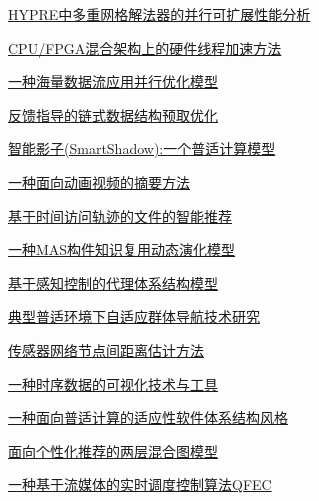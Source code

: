 \documentclass[a4paper]{article}
\begin{document}
\href{http://www.jos.org.cn/ch/reader/download_pdf.aspx?file_no=09002&year_id=2009&quarter_id=zk&falg=1}{HYPRE中多重网格解法器的并行可扩展性能分析}

\href{http://www.jos.org.cn/ch/reader/download_pdf.aspx?file_no=09003&year_id=2009&quarter_id=zk&falg=1}{CPU/FPGA混合架构上的硬件线程加速方法}

\href{http://www.jos.org.cn/ch/reader/download_pdf.aspx?file_no=09004&year_id=2009&quarter_id=zk&falg=1}{一种海量数据流应用并行优化模型}

\href{http://www.jos.org.cn/ch/reader/download_pdf.aspx?file_no=09005&year_id=2009&quarter_id=zk&falg=1}{反馈指导的链式数据结构预取优化}

\href{http://www.jos.org.cn/ch/reader/download_pdf.aspx?file_no=09006&year_id=2009&quarter_id=zk&falg=1}{智能影子(SmartShadow):一个普适计算模型}

\href{http://www.jos.org.cn/ch/reader/download_pdf.aspx?file_no=09007&year_id=2009&quarter_id=zk&falg=1}{一种面向动画视频的摘要方法}

\href{http://www.jos.org.cn/ch/reader/download_pdf.aspx?file_no=09008&year_id=2009&quarter_id=zk&falg=1}{基于时间访问轨迹的文件的智能推荐}

\href{http://www.jos.org.cn/ch/reader/download_pdf.aspx?file_no=09009&year_id=2009&quarter_id=zk&falg=1}{一种MAS构件知识复用动态演化模型}

\href{http://www.jos.org.cn/ch/reader/download_pdf.aspx?file_no=09010&year_id=2009&quarter_id=zk&falg=1}{基于感知控制的代理体系结构模型}

\href{http://www.jos.org.cn/ch/reader/download_pdf.aspx?file_no=09011&year_id=2009&quarter_id=zk&falg=1}{典型普适环境下自适应群体导航技术研究}

\href{http://www.jos.org.cn/ch/reader/download_pdf.aspx?file_no=09012&year_id=2009&quarter_id=zk&falg=1}{传感器网络节点间距离估计方法}

\href{http://www.jos.org.cn/ch/reader/download_pdf.aspx?file_no=09013&year_id=2009&quarter_id=zk&falg=1}{一种时序数据的可视化技术与工具}

\href{http://www.jos.org.cn/ch/reader/download_pdf.aspx?file_no=09014&year_id=2009&quarter_id=zk&falg=1}{一种面向普适计算的适应性软件体系结构风格}

\href{http://www.jos.org.cn/ch/reader/download_pdf.aspx?file_no=09015&year_id=2009&quarter_id=zk&falg=1}{面向个性化推荐的两层混合图模型}

\href{http://www.jos.org.cn/ch/reader/download_pdf.aspx?file_no=09016&year_id=2009&quarter_id=zk&falg=1}{一种基于流媒体的实时调度控制算法QFEC}
\end{document}
